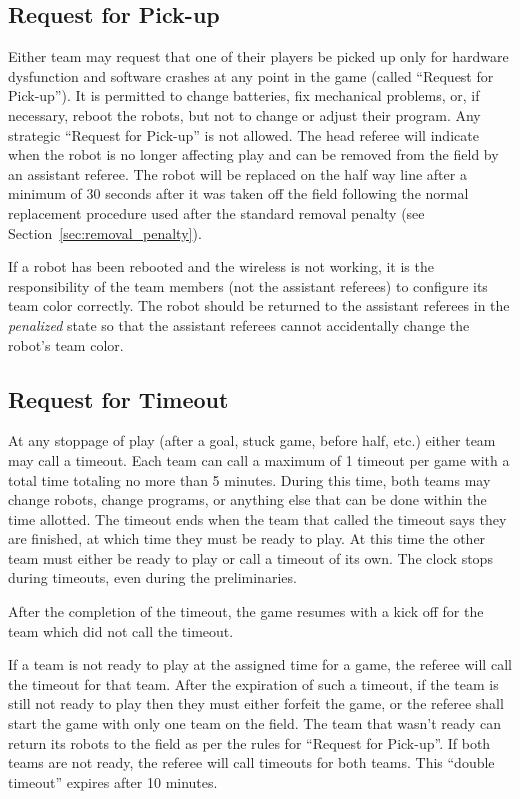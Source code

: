 \documentclass[12pt]{article}
\begin{document}
\subsection{Request for Pick-up}

Either team may request that one of their players be picked up only for hardware dysfunction and software crashes at any point in the game (called ``Request for Pick-up''). It is permitted to change batteries, fix mechanical problems, or, if necessary, reboot the robots, but not to change or adjust their program. Any strategic ``Request for Pick-up'' is not allowed. The head referee will indicate when the robot is no longer affecting play and can be removed from the field by an assistant referee. The robot will be replaced on the half way line after a minimum of 30 seconds after it was taken off the field following the normal replacement procedure used after the standard removal penalty (see Section~\ref{sec:removal_penalty}).

If a robot has been rebooted and the wireless is not working, it is the responsibility of the team members (not the assistant referees) to configure its team color correctly. The robot should be returned to the assistant referees in the \emph{penalized} state so that the assistant referees cannot accidentally change the robot's team color.

\subsection{Request for Timeout}

At any stoppage of play (after a goal, stuck game, before half, etc.) either team may call a timeout. Each team can call a maximum of 1 timeout per game with a total time totaling no more than 5 minutes. During this time, both teams may change robots, change programs, or anything else that can be done within the time allotted. The timeout ends when the team that called the timeout says they are finished, at which time they must be ready to play. At this time the other team must either be ready to play or call a timeout of its own. The clock stops during timeouts, even during the preliminaries.

After the completion of the timeout, the game resumes with a kick off for the team which did not call the timeout.

If a team is not ready to play at the assigned time for a game, the referee will call the timeout for that team. After the expiration of such a timeout, if the team is still not ready to play then they must either forfeit the game, or the referee shall start the game with only one team on the field.  The team that wasn't ready can return its robots to the field as per the rules for ``Request for Pick-up''. If both teams are not ready, the referee will call timeouts for both teams. This ``double timeout'' expires after 10 minutes.
\end{document}
